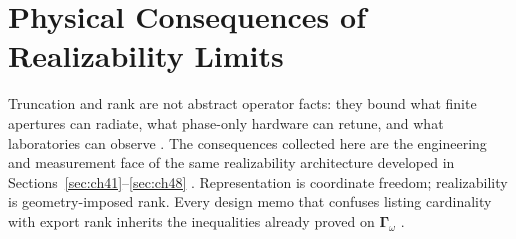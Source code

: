 \section{Physical Consequences of Realizability Limits}
\label{sec:ch49}

Truncation and rank are not abstract operator facts: they bound what finite apertures can radiate, what phase-only hardware can retune,
and what laboratories can observe \cite{stratton1941,harrington2001,devaney2004}. The consequences collected here are the engineering and
measurement face of the same realizability architecture developed in Sections~\ref{sec:ch41}--\ref{sec:ch48} \cite{hansen1988,jackson1999}.
Representation is coordinate freedom; realizability is geometry-imposed rank. Every design memo that confuses listing cardinality with export
rank inherits the inequalities already proved on \(\boldsymbol{\Gamma}_\omega\) \cite{stratton1941,harrington2001,devaney2004}.
